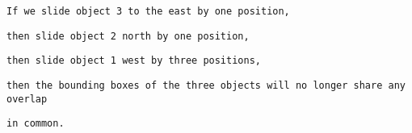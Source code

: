 \begin{verbatim}
If we slide object 3 to the east by one position, \end{verbatim}
\begin{verbatim}
then slide object 2 north by one position, \end{verbatim}
\begin{verbatim}
then slide object 1 west by three positions, \end{verbatim}
\begin{verbatim}
then the bounding boxes of the three objects will no longer share any overlap \end{verbatim}
\begin{verbatim}
in common.\end{verbatim}